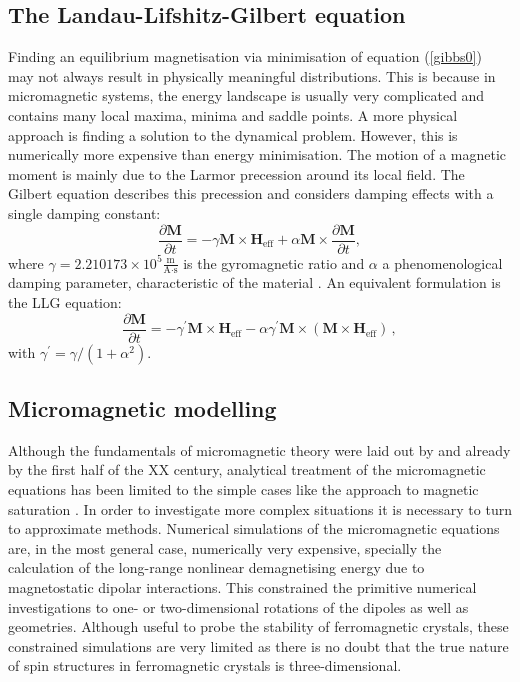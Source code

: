 \subsection{The Landau-Lifshitz-Gilbert equation}
Finding an equilibrium magnetisation via minimisation of equation (\ref{gibbs0}) may not always result in physically meaningful distributions. This is because in micromagnetic systems, the energy landscape is usually very complicated and contains many local maxima, minima and saddle points. A more physical approach is finding a solution to the dynamical problem. However, this is numerically more expensive than energy minimisation. The motion of a magnetic moment is mainly due to the Larmor precession around its local field. The Gilbert equation \citep{Gilbert2004} describes this precession and considers damping effects with a single damping constant:
\begin{equation}
\frac{\partial \boldsymbol{M}}{\partial t} = -\gamma\boldsymbol{M}\times\boldsymbol{H}_\text{eff} + \alpha\boldsymbol{M}\times\frac{\partial\boldsymbol{M}}{\partial t},
\end{equation}
where $\gamma = 2.210173 \times 10^5 \frac{\text{m}}{\text{A}\cdot\text{s}}$ is the gyromagnetic ratio and $\alpha$ a phenomenological damping parameter, characteristic of the material \citep{Gilbert2004}. An equivalent formulation is the LLG equation:
\begin{equation}
\frac{\partial\boldsymbol{M}}{\partial t} = -\gamma^{'} \boldsymbol{M}\times\boldsymbol{H}_\text{eff} - \alpha\gamma^{'} \boldsymbol{M}\times(\boldsymbol{M}\times\boldsymbol{H}_\text{eff}) \, ,
\end{equation}
with $\gamma^{'} = \gamma / (1+\alpha^2)$.

\subsection{Micromagnetic modelling}

Although the fundamentals of micromagnetic theory were laid out by \citet{Landau1935} and \citet{Brown} already by the first half of the XX century, analytical treatment of the micromagnetic equations has been limited to the simple cases like the approach to magnetic saturation \citep{Brown1940}. In order to investigate more complex situations it is necessary to turn to approximate methods. Numerical simulations of the micromagnetic equations are, in the most general case, numerically very expensive, specially the calculation of the long-range nonlinear demagnetising energy due to magnetostatic dipolar interactions. This constrained the primitive numerical investigations to one- or two-dimensional rotations of the dipoles as well as geometries. Although useful to probe the stability of ferromagnetic crystals, these constrained simulations are very limited as there is no doubt that the true nature of spin structures in ferromagnetic crystals is three-dimensional.\par

